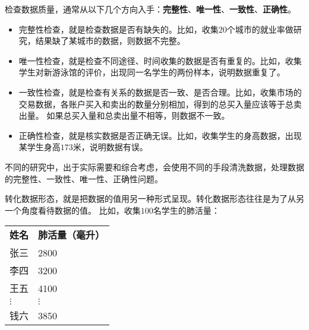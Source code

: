 \documentclass[12pt,UTF8]{ctexbook}
\theoremstyle{definition}
\theoremstyle{plain}
\begin{document}
检查数据质量，通常从以下几个方向入手：\textbf{完整性}、\textbf{唯一性}、\textbf{一致性}、\textbf{正确性}。
\begin{itemize}
    \item 完整性检查，就是检查数据是否有缺失的。比如，收集$20$个城市的就业率做研究，结果缺了某城市的数据，则数据不完整。
    \item 唯一性检查，就是检查不同途径、时间收集的数据是否有重复的。比如，收集学生对新游泳馆的评价，出现同一名学生的两份样本，说明数据重复了。
    \item 一致性检查，就是检查有关系的数据是否一致、是否合理。比如，收集市场的交易数据，各账户买入和卖出的数量分别相加，得到的总买入量应该等于总卖出量。
    如果总买入量和总卖出量不相等，则数据不一致。
    \item 正确性检查，就是核实数据是否正确无误。比如，收集学生的身高数据，出现某学生身高$173$米，说明数据有误。
\end{itemize}
不同的研究中，出于实际需要和综合考虑，会使用不同的手段清洗数据，处理数据的完整性、一致性、唯一性、正确性问题。

转化数据形态，就是把数据的值用另一种形式呈现。转化数据形态往往是为了从另一个角度看待数据的值。
比如，收集$100$名学生的肺活量：
\begin{center}
    \begin{tabular}{ p{3em}<{\centering} !{\color{white} \vrule width 2pt} p{7em}<{\centering} }
         \textbf{姓名} & \textbf{肺活量（毫升）} \\ [0.5ex] 
         张三 & 2800 \\  
         李四 & 3200 \\
         王五 & 4100 \\  
         $\vdots$ & $\vdots$ \\  
         钱六 & 3850 \\
    \end{tabular}
\end{center}
\end{document}
